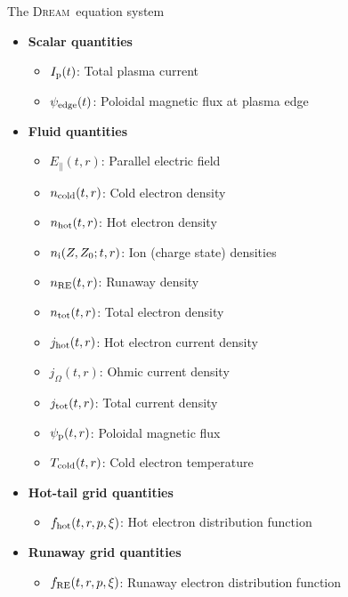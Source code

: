 \documentclass[titleunderline,widescreen1610]{chalmerspresentation}
\newcommand{\DREAM}{\textsc{Dream}}
\newcommand{\Efield}{E_\parallel}
\newcommand{\fhot}{f_{\rm hot}}
\newcommand{\fre}{f_{\rm RE}}
\newcommand{\Ip}{I_{\rm p}}
\newcommand{\ncold}{n_{\rm cold}}
\newcommand{\nhot}{n_{\rm hot}}
\newcommand{\ions}{n_{\rm i}}
\newcommand{\nre}{n_{\rm RE}}
\newcommand{\ntot}{n_{\rm tot}}
\newcommand{\jhot}{j_{\rm hot}}
\newcommand{\johm}{j_{\Omega}}
\newcommand{\jtot}{j_{\rm tot}}
\newcommand{\psiedge}{\psi_{\rm edge}}
\newcommand{\psip}{\psi_{\rm p}}
\newcommand{\Tcold}{T_{\rm cold}}
\begin{document}
    \begin{frame}{The \DREAM\ equation system}
        \begin{itemize}
            \item {\bf Scalar quantities}
            \begin{itemize}
                \item $\Ip(t)$: Total plasma current
                \item $\psiedge(t)$: Poloidal magnetic flux at plasma edge
            \end{itemize}
            \item {\bf Fluid quantities}
            \begin{itemize}
                \item $\Efield(t,r)$: Parallel electric field
                \item $\ncold(t,r)$: Cold electron density
                \item $\nhot(t,r)$: Hot electron density
                \item $\ions(Z,Z_0;t,r)$: Ion (charge state) densities
                \item $\nre(t,r)$: Runaway density
                \item $\ntot(t,r)$: Total electron density
                \item $\jhot(t,r)$: Hot electron current density
                \item $\johm(t,r)$: Ohmic current density
                \item $\jtot(t,r)$: Total current density
                \item $\psip(t,r)$: Poloidal magnetic flux
                \item $\Tcold(t,r)$: Cold electron temperature
            \end{itemize}
            \item {\bf Hot-tail grid quantities}
            \begin{itemize}
                \item $\fhot(t,r,p,\xi)$: Hot electron distribution function
            \end{itemize}
            \item {\bf Runaway grid quantities}
            \begin{itemize}
                \item $\fre(t,r,p,\xi)$: Runaway electron distribution function
            \end{itemize}
        \end{itemize}
    \end{frame}
\end{document}
